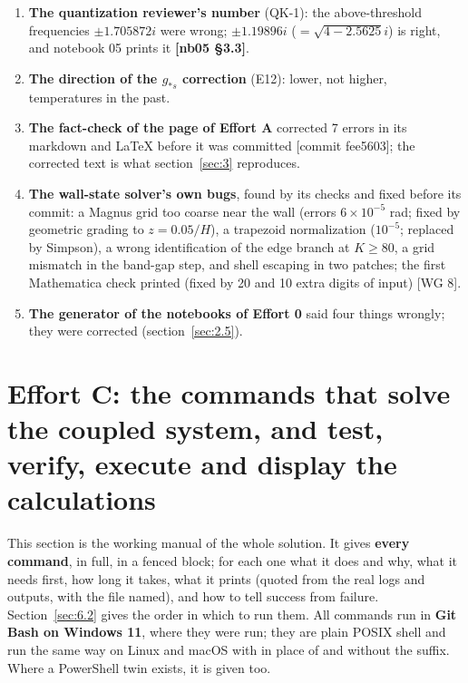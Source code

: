 \begin{enumerate}
  \item \textbf{The quantization reviewer's number} (QK-1): the above-threshold frequencies $\pm 1.705872 i$ were wrong; $\pm 1.19896 i$ ($= \sqrt{4 - 2.5625} i$) is right, and notebook 05 prints it \textbf{[nb05 \S{}3.3]}.
  \item \textbf{The direction of the $g_{*s}$ correction} (E12): lower, not higher, temperatures in the past.
  \item \textbf{The fact-check of the page of Effort A} corrected 7 errors in its markdown and LaTeX before it was committed [commit fee5603]; the corrected text is what section~\ref{sec:3} reproduces.
  \item \textbf{The wall-state solver's own bugs}, found by its checks and fixed before its commit: a Magnus grid too coarse near the wall (errors $6\times10^{-5}$ rad; fixed by geometric grading to $z = 0.05/H$), a trapezoid normalization ($10^{-5}$; replaced by Simpson), a wrong identification of the edge branch at $K \geq 80$, a grid mismatch in the band-gap step, and shell escaping in two patches; the first Mathematica check printed  (fixed by 20 and 10 extra digits of input) [WG 8].
  \item \textbf{The generator of the notebooks of Effort 0} said four things wrongly; they were corrected (section~\ref{sec:2.5}).
\end{enumerate}

\section{Effort C: the commands that solve the coupled system, and test, verify, execute and display the calculations}
\label{sec:6}

This section is the working manual of the whole solution. It gives \textbf{every command}, in full, in a fenced block; for each one what it does and why, what it needs first, how long it takes, what it prints (quoted from the real logs and outputs, with the file named), and how to tell success from failure. Section~\ref{sec:6.2} gives the order in which to run them. All commands run in \textbf{Git Bash on Windows 11}, where they were run; they are plain POSIX shell and run the same way on Linux and macOS with  in place of  and without the  suffix. Where a PowerShell twin exists, it is given too.

